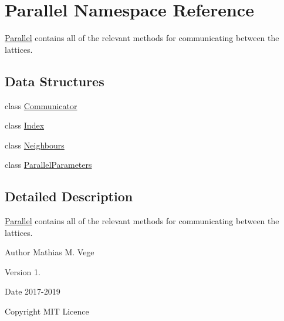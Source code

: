 \hypertarget{namespace_parallel}{}\section{Parallel Namespace Reference}
\label{namespace_parallel}


\mbox{\hyperlink{namespace_parallel}{Parallel}} contains all of the relevant methods for communicating between the lattices.  


\subsection*{Data Structures}
\begin{DoxyCompactItemize}
\item 
class \mbox{\hyperlink{class_parallel_1_1_communicator}{Communicator}}
\item 
class \mbox{\hyperlink{class_parallel_1_1_index}{Index}}
\item 
class \mbox{\hyperlink{class_parallel_1_1_neighbours}{Neighbours}}
\item 
class \mbox{\hyperlink{class_parallel_1_1_parallel_parameters}{Parallel\+Parameters}}
\end{DoxyCompactItemize}


\subsection{Detailed Description}
\mbox{\hyperlink{namespace_parallel}{Parallel}} contains all of the relevant methods for communicating between the lattices. 

\begin{DoxyAuthor}{Author}
Mathias M. Vege 
\end{DoxyAuthor}
\begin{DoxyVersion}{Version}
1. 
\end{DoxyVersion}
\begin{DoxyDate}{Date}
2017-\/2019 
\end{DoxyDate}
\begin{DoxyCopyright}{Copyright}
M\+IT Licence 
\end{DoxyCopyright}
